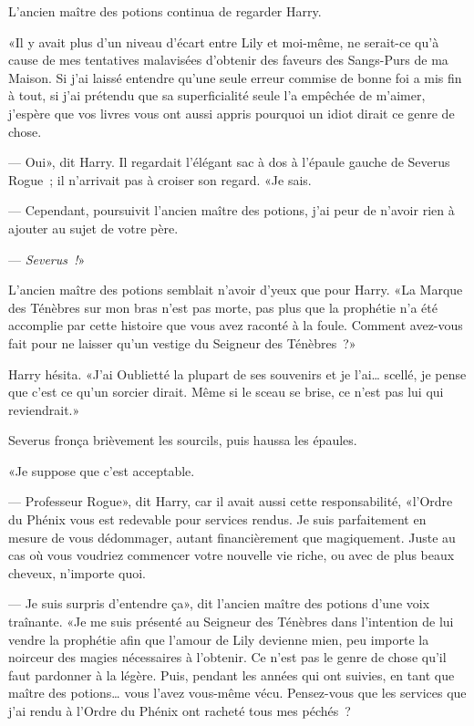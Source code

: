 L'ancien maître des potions continua de regarder Harry.

«Il y avait plus d'un niveau d'écart entre Lily et moi-même, ne serait-ce qu'à cause de mes tentatives malavisées d'obtenir des faveurs des Sangs-Purs de ma Maison. Si j'ai laissé entendre qu'une seule erreur commise de bonne foi a mis fin à tout, si j'ai prétendu que sa superficialité seule l'a empêchée de m'aimer, j'espère que vos livres vous ont aussi appris pourquoi un idiot dirait ce genre de chose.

--- Oui», dit Harry. Il regardait l'élégant sac à dos à l'épaule gauche de Severus Rogue~; il n'arrivait pas à croiser son regard. «Je sais.

--- Cependant, poursuivit l'ancien maître des potions, j'ai peur de n'avoir rien à ajouter au sujet de votre père.

--- \emph{Severus~!}»

L'ancien maître des potions semblait n'avoir d'yeux que pour Harry. «La Marque des Ténèbres sur mon bras n'est pas morte, pas plus que la prophétie n'a été accomplie par cette histoire que vous avez raconté à la foule. Comment avez-vous fait pour ne laisser qu'un vestige du Seigneur des Ténèbres~?»

Harry hésita. «J'ai Oublietté la plupart de ses souvenirs et je l'ai… scellé, je pense que c'est ce qu'un sorcier dirait. Même si le sceau se brise, ce n'est pas lui qui reviendrait.»

Severus fronça brièvement les sourcils, puis haussa les épaules.

«Je suppose que c'est acceptable.

--- Professeur Rogue», dit Harry, car il avait aussi cette responsabilité, «l'Ordre du Phénix vous est redevable pour services rendus. Je suis parfaitement en mesure de vous dédommager, autant financièrement que magiquement. Juste au cas où vous voudriez commencer votre nouvelle vie riche, ou avec de plus beaux cheveux, n'importe quoi.

--- Je suis surpris d'entendre ça», dit l'ancien maître des potions d'une voix traînante. «Je me suis présenté au Seigneur des Ténèbres dans l'intention de lui vendre la prophétie afin que l'amour de Lily devienne mien, peu importe la noirceur des magies nécessaires à l'obtenir. Ce n'est pas le genre de chose qu'il faut pardonner à la légère. Puis, pendant les années qui ont suivies, en tant que maître des potions… vous l'avez vous-même vécu. Pensez-vous que les services que j'ai rendu à l'Ordre du Phénix ont racheté tous mes péchés~?

